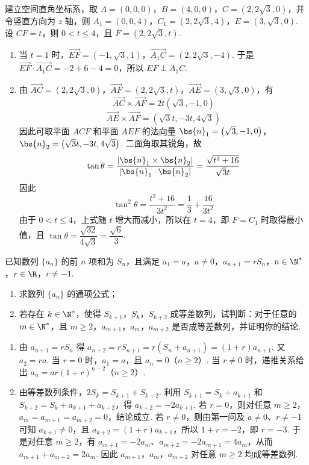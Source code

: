 \begin{solution}
建立空间直角坐标系，取 \(A=(0,0,0)\)，\(B=(4,0,0)\)，\(C=(2,2\sqrt{3},0)\)，并令竖直方向为 \(z\) 轴，则 \(A_{1}=(0,0,4)\)，\(C_{1}=(2,2\sqrt{3},4)\)，\(E=(3,\sqrt{3},0)\). 设 \(CF=t\)，则 \(0<t\leqslant4\)，且 \(F=(2,2\sqrt{3},t)\).
\begin{enumerate}
\item 当 \(t=1\) 时，\(\overrightarrow{EF}=(-1,\sqrt{3},1)\)，\(\overrightarrow{A_{1}C}=(2,2\sqrt{3},-4)\). 于是 \(\overrightarrow{EF}\cdot\overrightarrow{A_{1}C}=-2+6-4=0\)，所以 \(EF\perp A_{1}C\).
\item 由 \(\overrightarrow{AC}=(2,2\sqrt{3},0)\)，\(\overrightarrow{AF}=(2,2\sqrt{3},t)\)，\(\overrightarrow{AE}=(3,\sqrt{3},0)\)，有
\[
\overrightarrow{AC}\times\overrightarrow{AF}=2t\left(\sqrt{3},-1,0\right)
\]
\[
\overrightarrow{AE}\times\overrightarrow{AF}=\left(\sqrt{3}t,-3t,4\sqrt{3}\right)
\]
因此可取平面 \(ACF\) 和平面 \(AEF\) 的法向量
\(\bs{n}_1=\left(\sqrt{3},-1,0\right)\)，\(\bs{n}_2=\left(\sqrt{3}t,-3t,4\sqrt{3}\right)\).
二面角取其锐角，故
\[
\tan\theta=\frac{|\bs{n}_1\times\bs{n}_2|}{|\bs{n}_1\cdot\bs{n}_2|}=\frac{\sqrt{t^2+16}}{\sqrt{3}t}
\]
因此
\[
\tan^2\theta=\frac{t^2+16}{3t^2}=\frac{1}{3}+\frac{16}{3t^2}
\]
由于 \(0<t\leqslant4\)，上式随 \(t\) 增大而减小，所以在 \(t=4\)，即 \(F=C_{1}\) 时取得最小值，且 \(\tan\theta=\dfrac{\sqrt{32}}{4\sqrt{3}}=\dfrac{\sqrt{6}}{3}\).
\end{enumerate}
\end{solution}

\begin{problem}
已知数列 \(\{a_n\}\) 的前 \(n\) 项和为 \(S_n\)，且满足 \(a_1=a\)，\(a\neq0\)，\(a_{n+1}=rS_n\)，\(n\in\N^*\)，\(r\in\R\)，\(r\neq-1\).
\begin{enumerate}
\item 求数列 \(\{a_n\}\) 的通项公式；
\item 若存在 \(k\in\N^*\)，使得 \(S_{k+1}\)，\(S_k\)，\(S_{k+2}\) 成等差数列，试判断：对于任意的 \(m\in\N^*\)，且 \(m\geqslant2\)，\(a_{m+1}\)，\(a_m\)，\(a_{m+2}\) 是否成等差数列，并证明你的结论.
\end{enumerate}
\end{problem}

\begin{solution}
\begin{enumerate}
\item 由 \(a_{n+1}=rS_n\) 得 \(a_{n+2}=rS_{n+1}=r(S_n+a_{n+1})=(1+r)a_{n+1}\). 又 \(a_2=ra\). 当 \(r=0\) 时，\(a_1=a\)，且 \(a_n=0\)（\(n\geqslant2\)）. 当 \(r\neq0\) 时，递推关系给出 \(a_n=ar(1+r)^{n-2}\)（\(n\geqslant2\)）.
\item 由等差数列条件，\(2S_k=S_{k+1}+S_{k+2}\). 利用 \(S_{k+1}=S_k+a_{k+1}\) 和 \(S_{k+2}=S_k+a_{k+1}+a_{k+2}\)，得 \(a_{k+2}=-2a_{k+1}\). 若 \(r=0\)，则对任意 \(m\geqslant2\)，\(a_m=a_{m+1}=a_{m+2}=0\)，结论成立. 若 \(r\neq0\)，则由第一问及 \(a\neq0\)、\(r\neq-1\) 可知 \(a_{k+1}\neq0\)，且 \(a_{k+2}=(1+r)a_{k+1}\)，所以 \(1+r=-2\)，即 \(r=-3\). 于是对任意 \(m\geqslant2\)，有 \(a_{m+1}=-2a_m\)、\(a_{m+2}=-2a_{m+1}=4a_m\)，从而 \(a_{m+1}+a_{m+2}=2a_m\). 因此 \(a_{m+1}\)，\(a_m\)，\(a_{m+2}\) 对任意 \(m\geqslant2\) 均成等差数列.
\end{enumerate}
\end{solution}


